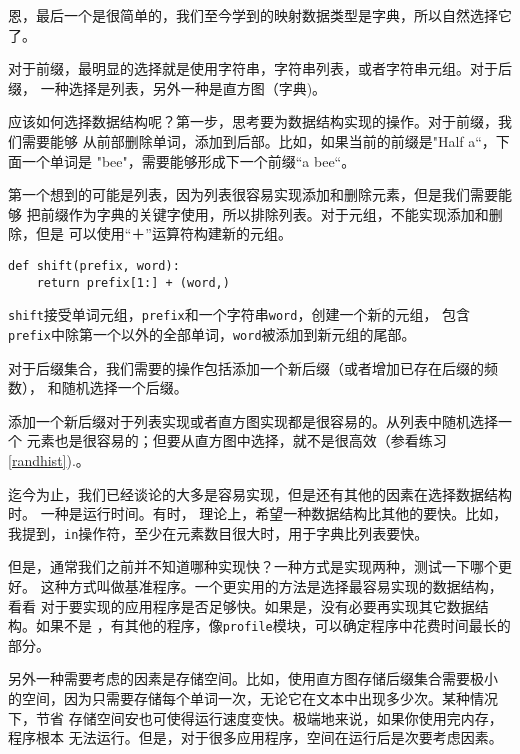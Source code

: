 恩，最后一个是很简单的，我们至今学到的映射数据类型是字典，所以自然选择它了。

对于前缀，最明显的选择就是使用字符串，字符串列表，或者字符串元组。对于后缀，
一种选择是列表，另外一种是直方图（字典)。


应该如何选择数据结构呢？第一步，思考要为数据结构实现的操作。对于前缀，我们需要能够
从前部删除单词，添加到后部。比如，如果当前的前缀是"Half a“，下面一个单词是
"bee"，需要能够形成下一个前缀“a bee“。


 第一个想到的可能是列表，因为列表很容易实现添加和删除元素，但是我们需要能够
 把前缀作为字典的关键字使用，所以排除列表。对于元组，不能实现添加和删除，但是
 可以使用“＋”运算符构建新的元组。

 \beforeverb
\begin{verbatim}
def shift(prefix, word):
    return prefix[1:] + (word,)
\end{verbatim}
\afterverb
%

{\tt shift}接受单词元组，{\tt prefix}和一个字符串{\tt word}，创建一个新的元组，
包含{\tt prefix}中除第一个以外的全部单词，{\tt word}被添加到新元组的尾部。

对于后缀集合，我们需要的操作包括添加一个新后缀（或者增加已存在后缀的频数），
和随机选择一个后缀。

添加一个新后缀对于列表实现或者直方图实现都是很容易的。从列表中随机选择一个
元素也是很容易的；但要从直方图中选择，就不是很高效（参看练习\ref{randhist}).。


迄今为止，我们已经谈论的大多是容易实现，但是还有其他的因素在选择数据结构时。
一种是运行时间。有时， 理论上，希望一种数据结构比其他的要快。比如，
我提到，{\tt in}操作符，至少在元素数目很大时，用于字典比列表要快。


 但是，通常我们之前并不知道哪种实现快？一种方式是实现两种，测试一下哪个更好。
 这种方式叫做基准程序。一个更实用的方法是选择最容易实现的数据结构，看看
 对于要实现的应用程序是否足够快。如果是，没有必要再实现其它数据结构。如果不是
 ，有其他的程序，像{\tt profile}模块，可以确定程序中花费时间最长的部分。


另外一种需要考虑的因素是存储空间。比如，使用直方图存储后缀集合需要极小
的空间，因为只需要存储每个单词一次，无论它在文本中出现多少次。某种情况下，节省
存储空间安也可使得运行速度变快。极端地来说，如果你使用完内存，程序根本
无法运行。但是，对于很多应用程序，空间在运行后是次要考虑因素。

